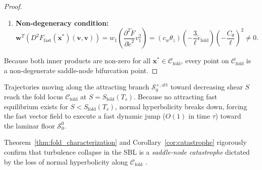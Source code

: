 \begin{proof}
\begin{enumerate}
    \item \textbf{Non-degeneracy condition:}
    \begin{equation}
    \mathbf{w}^T \left( D^2 F_{\mathrm{fast}}(\mathbf{x}^*)(\mathbf{v}, \mathbf{v}) \right) = w_1 \left( \frac{\partial^2 \tilde F}{\partial \tilde e^2} v_1^2 \right) = \left( c_w \theta_z \right) \left( -\frac{3}{\ell} \tilde e_{\mathrm{fold}} \right) \left( -\frac{C_\theta}{\ell} \right)^2 \neq 0.
    \end{equation}
\end{enumerate}
Because both inner products are non-zero for all $\mathbf{x}^* \in \mathcal{C}_{\mathrm{fold}}$, every point on $\mathcal{C}_{\mathrm{fold}}$ is a non-degenerate saddle-node bifurcation point.
\end{proof}

\begin{corollary}
\label{cor:catastrophe}
Trajectories moving along the attracting branch $\mathcal{S}_0^{+,\mathrm{att}}$ toward decreasing shear $S$ reach the fold locus $\mathcal{C}_{\mathrm{fold}}$ at $S = S_{\mathrm{fold}}(T_s)$. Because no attracting fast equilibrium exists for $S < S_{\mathrm{fold}}(T_s)$, normal hyperbolicity breaks down, forcing the fast vector field to execute a fast dynamic jump ($O(1)$ in time $\tau$) toward the laminar floor $\mathcal{S}_0^0$.
\end{corollary}

Theorem~\ref{thm:fold_characterization} and Corollary~\ref{cor:catastrophe} rigorously confirm that turbulence collapse in the SBL is a \emph{saddle-node catastrophe} dictated by the loss of normal hyperbolicity along $\mathcal{C}_{\mathrm{fold}}$ \citep{krupa2001extending, Kristiansen2024}.